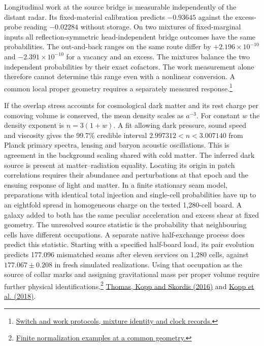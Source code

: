 \documentclass[11pt]{article}
\begin{document}
Longitudinal work at the source bridge is measurable independently of
the distant radar. Its fixed-material calibration predicts
$-0.93645$ against the excess-probe reading $-0.02284$ without storage.
On two mixtures of fixed-marginal inputs all reflection-symmetric
head-independent bridge outcomes have the same probabilities. The
out-and-back ranges on the same route differ by $+2.196\times10^{-10}$
and $-2.391\times10^{-10}$ for a vacancy and an excess. The mixtures
balance the two independent probabilities by their exact cofactors.
The work measurement alone therefore cannot determine this range even
with a nonlinear conversion. A common local proper geometry requires
a separately measured response.\footnote{\href{https://github.com/FloatingPragma/observer-patch-holography/tree/main/openwave/interval_echo/row_19/recovery_identity}{Switch and work protocols, mixture identity and clock records.}}

If the overlap stress accounts for cosmological dark matter and its
rest charge per comoving volume is conserved, the mean density scales
as $a^{-3}$. For constant $w$ the density exponent is $n=3(1+w)$.
A fit allowing dark pressure, sound speed and viscosity gives the
99.7\% credible interval $2.997312<n<3.007140$ from Planck primary
spectra, lensing and baryon acoustic oscillations. This is agreement
in the background scaling shared with cold matter. The inferred dark
source is present at matter--radiation equality. Locating its
origin in patch correlations requires their abundance and perturbations
at that epoch and the ensuing response of light and matter.
In a finite stationary seam model, preparations with identical total
injection and single-cell probabilities have up to an eightfold spread
in homogeneous charge on the tested 1,280-cell board. A galaxy added to
both has the same peculiar acceleration and excess shear at fixed geometry.
The unresolved source statistic is the probability that neighbouring
cells have different occupations. A separate native half-exchange
process does predict this statistic. Starting with a specified half-board
load, its pair evolution predicts 177.096 mismatched seams after eleven
services on 1,280 cells, against $177.067\pm0.208$ in fresh simulated
realizations. Using that occupation as the source of collar marks
and assigning gravitational mass per proper volume require further
physical identifications.\footnote{\href{https://github.com/FloatingPragma/observer-patch-holography/tree/main/code/cosmology/record_abundance}{Finite normalization examples at a common geometry.}}
\href{https://arxiv.org/abs/1601.05097}{Thomas, Kopp and Skordis (2016)} and
\href{https://arxiv.org/abs/1802.09541}{Kopp et al. (2018)}.
\end{document}
